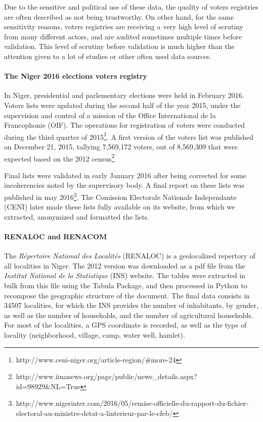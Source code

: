 Due to the sensitive and political use of these data, the quality of voters registries are often described as not being trustworthy. On other hand, for the same sensitivity reasons, voters registries are receiving a very high level of scrutiny from many different actors, and are audited sometimes multiple times before validation. This level of scrutiny before validation is much higher than the attention given to a lot of studies or other often used data sources.

\paragraph{The Niger 2016 elections voters registry} In Niger, presidential and parlementary elections were held in February 2016. Voters lists were updated during the second half of the year 2015, under the supervision and control of a mission of the Office International de la Francophonie (OIF). The operations for registration of voters were conducted during the third quarter of 2015\footnote{http://www.ceni-niger.org/article-region/#more-24}. A first version of the voters list was published on December 21, 2015, tallying 7,569,172 voters, out of 8,569,309 that were expected based on the 2012 census\footnote{http://www.iinanews.org/page/public/news_details.aspx?id=98929&NL=True}

Final lists were validated in early January 2016 after being corrected for some incoherencies noted by the supervisory body. A final report on these lists was published in may 2016\footnote{http://www.nigerinter.com/2016/05/remise-officielle-du-rapport-du-fichier-electoral-au-ministre-detat-a-linterieur-par-le-cfeb/}. The Comission Electorale Nationale Independante (CENI) later made these lists fully available on its website, from which we extracted, anonymized and formatted the lists.

\paragraph{RENALOC and RENACOM} The \textit{Répertoire National des Localités} (RENALOC) is a geolocalized repertory of all localities in Niger.  The 2012 version was downloaded as a pdf file from the \textit{Institut National de la Statistique} (INS) website. The tables were extracted in bulk from this file using the Tabula Package, and then processed in Python to recompose the geographic structure of the document. The final data consists in 34507 localities, for which the INS provides the number of inhabitants, by gender, as well as the number of households, and the number of agricultural households. For most of the localities, a GPS coordinate is recorded, as well as the type of locality (neighborhood, village, camp, water well, hamlet).

